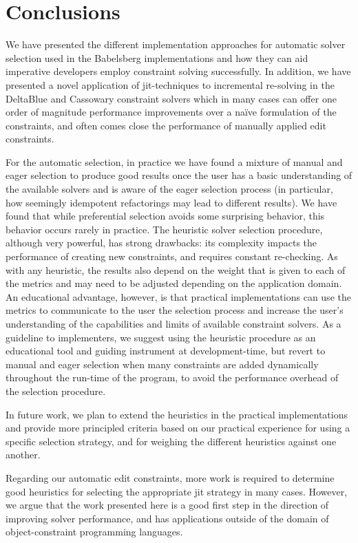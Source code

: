 \documentclass[numbers]{sigplanconf}
\newcommand{\ac}[1]{\gls{#1}}
\begin{document}
\section{Conclusions}
\label{sec:conclusions}

We have presented the different implementation approaches for automatic solver
selection used in the Babelsberg implementations and how they can aid imperative
developers employ constraint solving successfully. In addition, we have
presented a novel application of \ac{jit}-techniques to incremental re-solving
in the DeltaBlue and Cassowary constraint solvers which in many cases can offer
one order of magnitude performance improvements over a na\"ive formulation of
the constraints, and often comes close the performance of manually applied
edit constraints.

For the automatic selection, in practice we have found a mixture of manual and
eager selection to produce good results once the user has a basic understanding
of the available solvers and is aware of the eager selection process (in
particular, how seemingly idempotent refactorings may lead to different
results). We have found that while preferential selection avoids some surprising
behavior, this behavior occurs rarely in practice. The heuristic solver
selection procedure, although very powerful, has strong drawbacks: its
complexity impacts the performance of creating new constraints, and requires
constant re-checking. As with any heuristic, the results also depend on the
weight that is given to each of the metrics and may need to be adjusted
depending on the application domain. An educational advantage, however, is that
practical implementations can use the metrics to communicate to the user the
selection process and increase the user's understanding of the capabilities and
limits of available constraint solvers. As a guideline to implementers, we
suggest using the heuristic procedure as an educational tool and guiding
instrument at development-time, but revert to manual and eager selection when
many constraints are added dynamically throughout the run-time of the program,
to avoid the performance overhead of the selection procedure.

In future work, we plan to extend the heuristics in the practical
implementations and provide more principled criteria based on our practical
experience for using a specific selection strategy, and for weighing the
different heuristics against one another.

Regarding our automatic edit constraints, more work is required to determine
good heuristics for selecting the appropriate \ac{jit} strategy in many
cases. However, we argue that the work presented here is a good first step in
the direction of improving solver performance, and has applications outside of
the domain of object-constraint programming languages.



\balance
\end{document}
